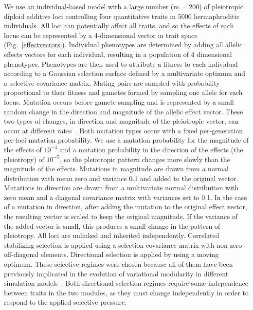 \begin{refsection}
We use an individual-based model with a large number (m = 200) of pleiotropic
diploid additive loci controlling four quantitative traits in 5000
hermaphroditic individuals. All loci can potentially affect all traits, and so
the effects of each locus can be represented by a 4-dimensional vector in
trait space (Fig.~\ref{effectvectors}). Individual phenotypes are determined
by adding all allelic effects vectors for each individual, resulting in a
population of 4 dimensional phenotypes. Phenotypes are then used to attribute
a fitness to each individual according to a Gaussian selection surface defined
by a multivariate optimum and a selective covariance matrix. Mating pairs are
sampled with probability proportional to their fitness and gametes formed by
sampling one allele for each locus. Mutation occurs before gamete sampling and
is represented by a small random change in the direction and magnitude of the
allelic effect vector. These two types of changes, in direction and magnitude
of the pleiotropic vector, can occur at different rates~\parencite[for a
discussion on both types of mutations see][]{Draghi2010-ye}. Both mutation
types occur with a fixed per-generation per-loci mutation probability. We use
a mutation probability for the magnitude of the effects of $10^{-4}$ and a
mutation probability in the direction of the effects (the pleiotropy) of
$10^{-5}$, so the pleiotropic pattern changes more slowly than the magnitude
of the effects. Mutations in magnitude are drawn from a normal distribution
with mean zero and variance 0.1 and added to the original vector. Mutations in
direction are drawn from a multivariate normal distribution with zero mean and
a diagonal covariance matrix with variances set to 0.1. In the case of a
mutation in direction, after adding the mutation to the original effect
vector, the resulting vector is scaled to keep the original magnitude. If the
variance of the added vector is small, this produces a small change in the
pattern of pleiotropy. All loci are unlinked and inherited independently.
Correlated stabilizing selection is applied using a selection covariance
matrix with non-zero off-diagonal elements. Directional selection is applied
by using a moving optimum. These selective regimes were chosen because all of
them have been previously implicated in the evolution of variational
modularity in different simulation models~\parencite{Jones2014-wj,
Melo2015-bk}. Both directional selection regimes require some independence
between traits in the two modules, as they must change independently in order
to respond to the applied selective pressure.


\end{refsection}
